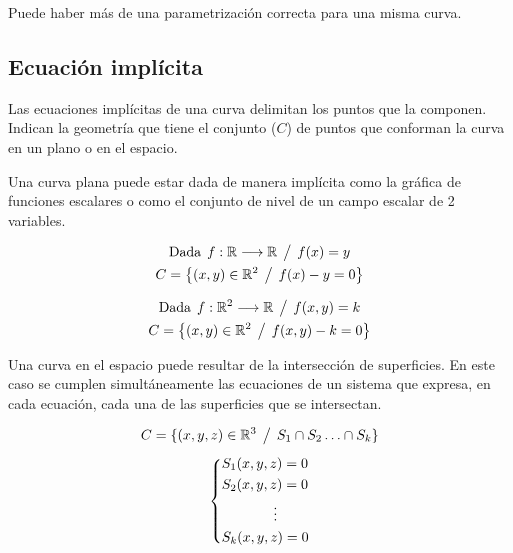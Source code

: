 \documentclass[a5paper,12pt,twoside]{book}
\begin{document}
Puede haber más de una parametrización correcta para una misma curva.


\subsection{Ecuación implícita}

Las ecuaciones implícitas de una curva delimitan los puntos que la componen.
Indican la geometría que tiene el conjunto ($C$) de puntos que conforman la curva en un plano o en el espacio.

Una curva plana puede estar dada de manera implícita como la gráfica de funciones escalares o como el conjunto de nivel de un campo escalar de 2 variables.

\begin{gather*}
    \textrm{Dada} \hspace{1ex} f:\mathbb{R} \longrightarrow \mathbb{R} \hspace{1ex} \big/ \hspace{1ex} f(x)=y
    \\
    C = { \left\{ { (x,y) \in \mathbb{R}^2 \hspace{1ex} \big/ \hspace{1ex} f(x)-y=0 } \right\} }
\end{gather*}

\begin{gather*}
    \textrm{Dada} \hspace{1ex} f:\mathbb{R}^2 \longrightarrow \mathbb{R} \hspace{1ex} \big/ \hspace{1ex} f(x,y)=k
    \\
    C = { \left\{ { (x,y) \in \mathbb{R}^2 \hspace{1ex} \big/ \hspace{1ex} f(x,y)-k=0 } \right\} }
\end{gather*}

Una curva en el espacio puede resultar de la intersección de superficies.
En este caso se cumplen simultáneamente las ecuaciones de un sistema que expresa, en cada ecuación, cada una de las superficies que se intersectan.

\begin{gather*}
    C = \{ (x,y,z) \in \mathbb{R}^3 \hspace{1ex} \big/ \hspace{1ex} S_1 \cap S_2 \ldots \cap S_k \}
    \\[1ex]
    \left\{
    \begin{aligned}
        & S_1 (x,y,z)=0
        \\
        & S_2 (x,y,z)=0
        \\
        & \hspace{1.3cm} \vdots
        \\
        & S_k (x,y,z)=0
    \end{aligned}
    \right.
\end{gather*}
\end{document}
